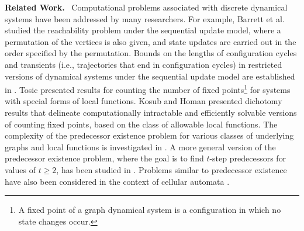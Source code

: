 \noindent
\textbf{Related Work.}~ %
Computational problems associated with 
discrete dynamical systems 
have been addressed by many researchers.
For example, Barrett et al. \cite{BH+06} studied the
reachability problem under the sequential
update model, where a permutation of the vertices is also given,
and state updates are carried out in the order specified by the
permutation.  
Bounds on the lengths of configuration cycles and transients 
(i.e., trajectories that end in configuration cycles) in restricted versions
of dynamical systems under the sequential update model are established
in \cite{MR-2007}.  
Tosic \cite{Tos-2010,Tosic-2017} presented results for counting
the number of fixed points\footnote{A fixed point of a graph dynamical
system is a configuration in which no state changes occur.}
for systems with special forms of local functions.
Kosub and Homan \cite{KH-2007} presented dichotomy
results that delineate computationally intractable and efficiently
solvable versions of counting fixed points, based on the class of
allowable local functions.  
The complexity of the predecessor existence problem 
for various classes of underlying graphs and local functions is 
investigated in \cite{BH+07}.
A more general version of the predecessor existence problem,
where the goal is to find $t$-step predecessors for values of $t \geq 2$,
has been studied in \cite{Kawachi-et-al-2017,MR+2018}.
Problems similar to predecessor existence have
also been considered in the context of cellular automata
\cite{Gre-1987,Dur-1994}.
